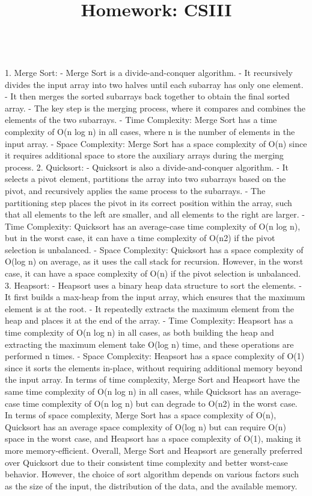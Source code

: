 \documentclass{article}
\begin{document}
\title{Homework: CSIII}
\\[2\baselineskip]1. Merge Sort: - Merge Sort is a divide-and-conquer algorithm. - It recursively divides the input array into two halves until each subarray has only one element. - It then merges the sorted subarrays back together to obtain the final sorted array. - The key step is the merging process, where it compares and combines the elements of the two subarrays. - Time Complexity: Merge Sort has a time complexity of O(n log n) in all cases, where n is the number of elements in the input array. - Space Complexity: Merge Sort has a space complexity of O(n) since it requires additional space to store the auxiliary arrays during the merging process. 2. Quicksort: - Quicksort is also a divide-and-conquer algorithm. - It selects a pivot element, partitions the array into two subarrays based on the pivot, and recursively applies the same process to the subarrays. - The partitioning step places the pivot in its correct position within the array, such that all elements to the left are smaller, and all elements to the right are larger. - Time Complexity: Quicksort has an average-case time complexity of O(n log n), but in the worst case, it can have a time complexity of O(n2) if the pivot selection is unbalanced. - Space Complexity: Quicksort has a space complexity of O(log n) on average, as it uses the call stack for recursion. However, in the worst case, it can have a space complexity of O(n) if the pivot selection is unbalanced. 3. Heapsort: - Heapsort uses a binary heap data structure to sort the elements. - It first builds a max-heap from the input array, which ensures that the maximum element is at the root. - It repeatedly extracts the maximum element from the heap and places it at the end of the array. - Time Complexity: Heapsort has a time complexity of O(n log n) in all cases, as both building the heap and extracting the maximum element take O(log n) time, and these operations are performed n times. - Space Complexity: Heapsort has a space complexity of O(1) since it sorts the elements in-place, without requiring additional memory beyond the input array. In terms of time complexity, Merge Sort and Heapsort have the same time complexity of O(n log n) in all cases, while Quicksort has an average-case time complexity of O(n log n) but can degrade to O(n2) in the worst case. In terms of space complexity, Merge Sort has a space complexity of O(n), Quicksort has an average space complexity of O(log n) but can require O(n) space in the worst case, and Heapsort has a space complexity of O(1), making it more memory-efficient. Overall, Merge Sort and Heapsort are generally preferred over Quicksort due to their consistent time complexity and better worst-case behavior. However, the choice of sort algorithm depends on various factors such as the size of the input, the distribution of the data, and the available memory.
\end{document}
